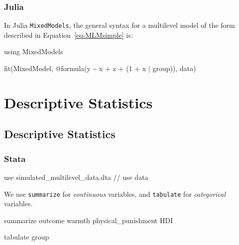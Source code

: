 \documentclass[
  letterpaper,
  DIV=11,
  numbers=noendperiod]{scrreprt}
\newenvironment{Shaded}{\begin{snugshade}}{\end{snugshade}}
\newcommand{\BuiltInTok}[1]{\textcolor[rgb]{0.00,0.23,0.31}{#1}}
\newcommand{\CommentTok}[1]{\textcolor[rgb]{0.37,0.37,0.37}{#1}}
\newcommand{\FloatTok}[1]{\textcolor[rgb]{0.68,0.00,0.00}{#1}}
\newcommand{\FunctionTok}[1]{\textcolor[rgb]{0.28,0.35,0.67}{#1}}
\newcommand{\ImportTok}[1]{\textcolor[rgb]{0.00,0.46,0.62}{#1}}
\newcommand{\KeywordTok}[1]{\textcolor[rgb]{0.00,0.23,0.31}{#1}}
\newcommand{\NormalTok}[1]{\textcolor[rgb]{0.00,0.23,0.31}{#1}}
\newcommand{\OperatorTok}[1]{\textcolor[rgb]{0.37,0.37,0.37}{#1}}
\newcommand{\PreprocessorTok}[1]{\textcolor[rgb]{0.68,0.00,0.00}{#1}}
\begin{document}
\subsection{Julia}

In Julia \texttt{MixedModels}, the general syntax for a multilevel model
of the form described in Equation~\ref{eq-MLMsimple} is:

\begin{Shaded}
\begin{Highlighting}[]
\ImportTok{using} \BuiltInTok{MixedModels}

\FunctionTok{fit}\NormalTok{(MixedModel, }\PreprocessorTok{@formula}\NormalTok{(y }\OperatorTok{\textasciitilde{}}\NormalTok{ x }\OperatorTok{+}\NormalTok{ z }\OperatorTok{+}\NormalTok{ (}\FloatTok{1} \OperatorTok{+}\NormalTok{ x }\OperatorTok{|}\NormalTok{ group)), data)}
\end{Highlighting}
\end{Shaded}


\chapter{Descriptive Statistics}\label{descriptive-statistics}

\section{Descriptive Statistics}\label{descriptive-statistics-1}

\subsection{Stata}

\begin{Shaded}
\begin{Highlighting}[]

\KeywordTok{use}\NormalTok{ simulated\_multilevel\_data.dta }\CommentTok{// use data}
\end{Highlighting}
\end{Shaded}

We use \texttt{summarize} for \emph{continuous} variables, and
\texttt{tabulate} for \emph{categorical} variables.

\begin{Shaded}
\begin{Highlighting}[]

\KeywordTok{summarize}\NormalTok{ outcome warmth physical\_punishment HDI}

\KeywordTok{tabulate} \FunctionTok{group}
\end{Highlighting}
\end{Shaded}
\end{document}
